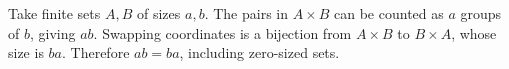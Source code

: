 Take finite sets $A,B$ of sizes $a,b$. The pairs in $A\times B$ can be counted as $a$ groups of $b$, giving $ab$. Swapping coordinates is a bijection from $A\times B$ to $B\times A$, whose size is $ba$. Therefore $ab=ba$, including zero-sized sets.
